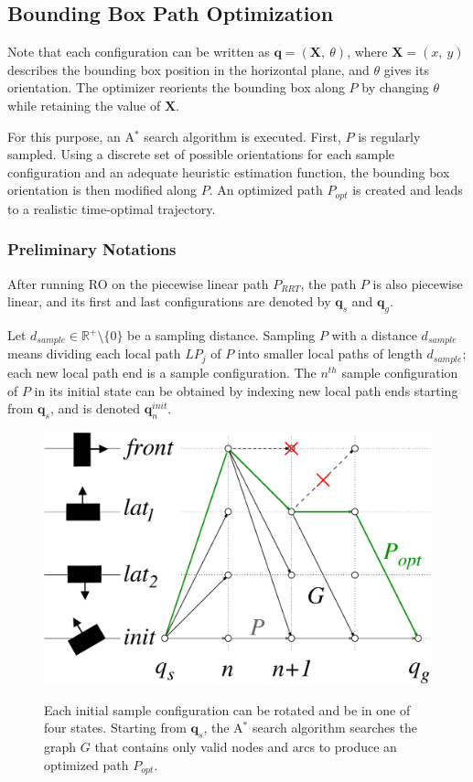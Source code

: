 \subsection{Bounding Box Path Optimization}
Note that each configuration \config{} can be written as $\mathbf{q} =
(\mathbf{X},~\theta)$, where $\mathbf{X} = (x,~y)$ describes the
bounding box position in the horizontal plane, and $\theta$ gives its
orientation.  The optimizer reorients the bounding box along $P$ by
changing $\theta$ while retaining the value of $\mathbf{X}$.

For this purpose, an A$^{*}$ search algorithm is executed. First, $P$
is regularly sampled. Using a discrete set of possible orientations
for each sample configuration and an adequate heuristic estimation
function, the bounding box orientation is then modified along $P$. An
optimized path $P_{opt}$ is created and leads to a realistic
time-optimal trajectory.

\subsubsection{Preliminary Notations}
After running RO on the piecewise linear path $P_{RRT}$, the
path $P$ is also piecewise linear, and its first and last
configurations are denoted by $\mathbf{q}_s$ and $\mathbf{q}_g$.

Let $d_{sample} \in \mathbb{R}^+\setminus\{0\}$ be a sampling
distance. Sampling $P$ with a distance $d_{sample}$ means dividing
each local path $LP_j$ of $P$ into smaller local paths of length
$d_{sample}$; each new local path end is a sample configuration. The
$n^{th}$ sample configuration of $P$ in its initial state can be
obtained by indexing new local path ends starting from $\mathbf{q}_s$,
and is denoted $\mathbf{q}_n^{init}$.

\begin{figure}
  \centering
      {\includegraphics[width = 0.75\linewidth]
        {src/chap1-path-optimization/A-star.pdf}}
      \caption{Each initial sample configuration can be rotated and be
        in one of four states. Starting from $\mathbf{q}_s$, the
        A$^{*}$ search algorithm searches the graph $G$ that contains
        only valid nodes and arcs to produce an optimized path
        $P_{opt}$.}
      \label{fig:chap1-A-star}
\end{figure}

